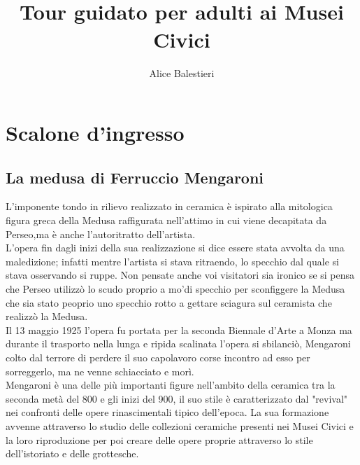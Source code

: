 \documentclass[12pt,a4paper]{article}
\begin{document}
	
	\title{\textbf{\\Tour guidato per adulti ai Musei Civici}}
	\author{Alice Balestieri}
	\date{}
	
	\maketitle
	\newpage
	
	\tableofcontents
	\newpage
	
	\section{Scalone d'ingresso}
	
	\subsection{La medusa di Ferruccio Mengaroni}
	L'imponente tondo in rilievo realizzato in ceramica è ispirato alla mitologica figura greca della Medusa raffigurata nell'attimo in cui viene decapitata da Perseo,ma è anche l’autoritratto dell'artista.\\
	L'opera fin dagli inizi della sua realizzazione si dice essere stata avvolta da una maledizione; infatti mentre l'artista si stava ritraendo, lo specchio dal quale si stava osservando si ruppe. Non pensate anche voi visitatori sia ironico se si pensa che Perseo utilizzò lo scudo proprio a mo'di specchio per sconfiggere la Medusa che sia stato peoprio uno specchio rotto a gettare sciagura sul ceramista che realizzò la Medusa.\\
	Il 13 maggio 1925 l'opera fu portata per la seconda Biennale d'Arte a Monza ma durante il trasporto nella lunga e ripida scalinata l'opera si sbilanciò, Mengaroni colto dal terrore di perdere il suo capolavoro corse incontro ad esso per sorreggerlo, ma ne venne schiacciato e morì.\\
	Mengaroni è una delle più importanti figure nell'ambito della ceramica tra la seconda metà del 800 e gli inizi del 900, il suo stile è caratterizzato dal "revival" nei confronti delle opere rinascimentali tipico dell'epoca. La sua formazione avvenne attraverso lo studio delle collezioni ceramiche presenti nei Musei Civici e la loro riproduzione per poi creare delle opere proprie attraverso lo stile dell'istoriato e delle grottesche.
	
\end{document}
